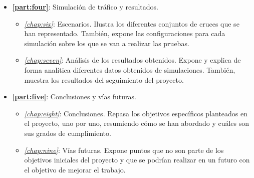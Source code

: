 \begin{itemize}
    \item \textbf{\autoref{part:four}}: Simulación de tráfico y resultados.
    \begin{itemize}
        \item \textit{\autoref{chap:six}}: Escenarios. Ilustra los diferentes conjuntos de cruces que se han representado. También, expone las configuraciones para cada simulación sobre los que se van a realizar las pruebas.
        \item \textit{\autoref{chap:seven}}: Análisis de los resultados obtenidos. Expone y explica de forma analítica diferentes datos obtenidos de simulaciones. También, muestra los resultados del seguimiento del proyecto.  
    \end{itemize}
    
    \item \textbf{\autoref{part:five}}: Conclusiones y vías futuras.
    \begin{itemize}
        \item \textit{\autoref{chap:eight}}: Conclusiones. Repasa los objetivos específicos planteados en el proyecto, uno por uno, resumiendo cómo se han abordado y cuáles son sus grados de cumplimiento.
        \item \textit{\autoref{chap:nine}}: Vías futuras. Expone puntos que no son parte de los objetivos iniciales del proyecto y que se podrían realizar en un futuro con el objetivo de mejorar el trabajo.
    \end{itemize}
\end{itemize}